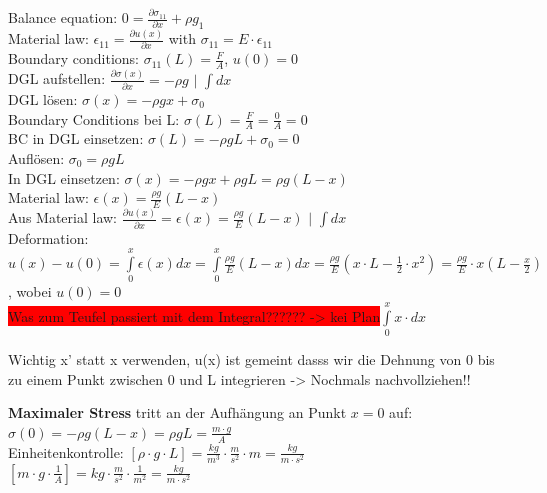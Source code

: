 \documentclass[a4paper]{scrartcl}
\begin{document}
\begin{minipage}{14cm}
Balance equation: $0 = \frac{\partial \sigma_{11}}{\partial x} + \rho g_1$\\
Material law: $\epsilon_{11} = \frac{\partial u(x)}{\partial x}$ with
$\sigma_{11} = E \cdot \epsilon_{11}$\\
Boundary conditions: $\sigma_{11} (L) = \frac{F}{A}$, $u(0)= 0$\\

DGL aufstellen: $\frac{\partial \sigma (x)}{\partial x} = - \rho g$ $\mid$ $\int
dx$\\
DGL lösen: $\sigma (x) = - \rho g x + \sigma_0$\\
Boundary Conditions bei L: $\sigma (L) = \frac{F}{A} = \frac{0}{A} = 0$\\
BC in DGL einsetzen: $\sigma (L) = - \rho g L + \sigma_0 = 0$\\
Auflösen: $\sigma_0 = \rho g L$\\
In DGL einsetzen: $\sigma (x) = - \rho g x + \rho g L = \rho g (L-x)$\\
Material law: $\epsilon (x) = \frac{\rho g}{E} (L-x)$\\
Aus Material law: $\frac{\partial u(x)}{\partial x} = \epsilon (x) = \frac{\rho
g}{E} (L-x)$ $\mid$ $\int dx$\\
Deformation: $u(x) - u(0) = \int\limits_{0}^{x} \epsilon(x) dx =
\int\limits_{0}^{x} \frac{\rho g}{E} (L-x) dx = \frac{\rho g}{E} (x \cdot L -
\frac{1}{2} \cdot x^2) = \frac{\rho g}{E} \cdot x(L-\frac{x}{2})$, wobei $u(0) =
0$\\
\colorbox{red}{Was zum Teufel passiert mit dem
Integral?????? -> kei Plan}$\int\limits_{0}^{x} x \cdot dx$

Wichtig x' statt x verwenden, u(x) ist gemeint dasss wir die Dehnung von 0 bis
zu einem Punkt zwischen 0 und L integrieren -> Nochmals nachvollziehen!!

\end{minipage}
\textbf{Maximaler Stress} tritt an der Aufhängung an Punkt $x = 0$ auf:\\
$\sigma(0) = - \rho g (L-x) = \rho g L = \frac{m \cdot g}{A}$\\
Einheitenkontrolle: $[\rho \cdot g \cdot L] = \frac{kg}{m^3} \cdot
\frac{m}{s^2} \cdot m = \frac{kg}{m \cdot s^2}$\\
$[m \cdot g \cdot \frac{1}{A}] = kg \cdot \frac{m}{s^2} \cdot \frac{1}{m^2} =
\frac{kg}{m \cdot s^2}$\\
\end{document}
